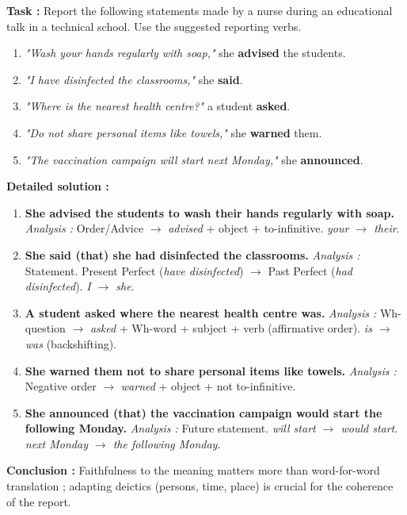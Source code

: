 \documentclass[11pt]{article}
\newcommand{\cle}[1]{{\popxbold\color{popdark}#1}}
\begin{document}
\begin{exoresolu}
\textbf{Task :} Report the following statements made by a nurse during an educational talk in a technical school. Use the suggested reporting verbs.
\begin{enumerate}
    \item \textit{"Wash your hands regularly with soap,"} she \textbf{advised} the students.
    \item \textit{"I have disinfected the classrooms,"} she \textbf{said}.
    \item \textit{"Where is the nearest health centre?"} a student \textbf{asked}.
    \item \textit{"Do not share personal items like towels,"} she \textbf{warned} them.
    \item \textit{"The vaccination campaign will start next Monday,"} she \textbf{announced}.
\end{enumerate}

\tcblower
\textbf{Detailed solution :}
\begin{enumerate}
    \item \textbf{She \cle{advised} the students \cle{to wash} their hands regularly with soap.}
    \textit{Analysis :} Order/Advice $\rightarrow$ \textit{advised} + object + \cle{to-infinitive}. \textit{your $\rightarrow$ their}.
    \item \textbf{She \cle{said} (that) she \cle{had disinfected} the classrooms.}
    \textit{Analysis :} Statement. Present Perfect (\textit{have disinfected}) $\rightarrow$ Past Perfect (\textit{had disinfected}). \textit{I $\rightarrow$ she}.
    \item \textbf{A student \cle{asked} \cle{where} the nearest health centre \cle{was}.}
    \textit{Analysis :} Wh-question $\rightarrow$ \textit{asked} + Wh-word + subject + verb (affirmative order). \textit{is $\rightarrow$ was} (backshifting).
    \item \textbf{She \cle{warned} them \cle{not to share} personal items like towels.}
    \textit{Analysis :} Negative order $\rightarrow$ \textit{warned} + object + \cle{not to-infinitive}.
    \item \textbf{She \cle{announced} (that) the vaccination campaign \cle{would start} \cle{the following Monday}.}
    \textit{Analysis :} Future statement. \textit{will start $\rightarrow$ would start}. \textit{next Monday $\rightarrow$ the following Monday}.
\end{enumerate}
\textbf{Conclusion :} Faithfulness to the meaning matters more than word-for-word translation ; adapting deictics (persons, time, place) is crucial for the coherence of the report.
\end{exoresolu}
\end{document}
